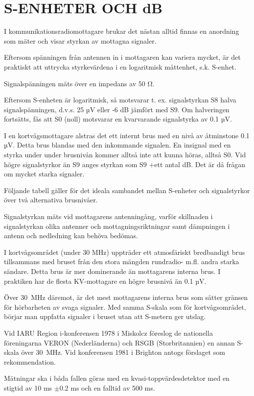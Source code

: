 \chapter{S-ENHETER OCH dB}
\label{s-enhet}

I kommunikationsradiomottagare brukar det nästan alltid finnas en
anordning som mäter och visar styrkan av mottagna signaler.

Eftersom spänningen från antennen in i mottagaren kan variera mycket,
är det praktiskt att uttrycka styrkevärdena i en logaritmisk måttenhet,
s.k. S-enhet.

Signalspänningen mäts över en impedans av 50 Ω.

Eftersom S-enheten är logaritmisk, så motsvarar t. ex. signalstyrkan
S8 halva signalspänningen, d.v.s. 25 µV eller -6 dB jämfört med S9. Om
halveringen fortsätts, fås att S0 (noll) motsvarar en kvarvarande
signalstyrka av 0.1 µV.

I en kortvågsmottagare alstras det ett internt brus med en nivå av
åtminstone 0.1 µV.  Detta brus blandas med den inkommande signalen. En
insignal med en styrka under under brusnivån kommer alltså inte att
kunna höras, alltså S0. Vid högre signalstyrkor än S9 anges styrkan
som S9 +ett antal dB. Det är då frågan om mycket starka signaler.

Följande tabell gäller för det ideala sambandet mellan S-enheter och
signalstyrkor över två alternativa brusnivåer.

Signalstyrkan mäts vid mottagarens antenningång, varför skillnaden i
signalstyrkan olika antenner och mottagningsriktningar samt dämpningen
i antenn och nedledning kan behöva bedömas.

I kortvågsområdet (under 30 MHz) uppträder ett atmosfäriskt
bredbandigt brus tillsammans med bruset från den stora mängden
rundradio- m.fl. andra starka sändare.  Detta brus är mer dominerande
än mottagarens interna brus. I praktiken har de flesta KV-mottagare en
högre brusnivå än 0.1 µV.

Över 30~MHz däremot, är det mest mottagarens interna brus som sätter
gränsen för hörbarheten av svaga signaler. Med samma S-skala som för
kortvågsområdet, börjar man uppfatta signaler i bruset utan att
S-metern ger utslag.

Vid IARU Region i-konferensen 1978 i Miskolcz föreslog de nationella
föreningarna VERON (Nederländerna) och RSGB (Storbritannien) en annan
S-skala över 30~MHz.  Vid konferensen 1981 i Brighton antogs förslaget
som rekommendation.

Mätningar ska i båda fallen göras med en kvasi-toppvärdesdetektor
med en stigtid av 10 ms \(\pm\)0.2 ms och en falltid av 500 ms.

